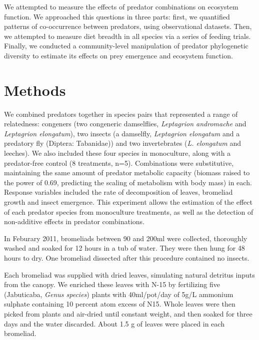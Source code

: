 \documentclass[10pt]{article}
\begin{document}
\begin{spacing}{2}
We attempted to measure the effects of predator combinations on
ecosystem function.  We approached this questions in three parts:
first, we quantified patterns of co-occurrence between predators, using
observational datasets.  Then, we attempted to measure diet breadth in
all species via a series of feeding trials.  Finally, we conducted a
community-level manipulation of predator phylogenetic diversity to
estimate its effects on prey emergence and ecosystem function.

\section{Methods}



We combined predators together in species pairs that represented a
range of relatedness: congeners (two congeneric damselflies,
\emph{Leptagrion andromache} and \emph{Leptagrion elongatum}), two
insects (a damselfly, \emph{Leptagrion elongatum} and a predatory fly
(Diptera: Tabanidae)) and two invertebrates (\emph{L. elongatum} and
leeches).  We also included these four species in monoculture, along
with a predator-free control (8 treatments, n=5).  Combinations were
substitutive, maintaining the same amount of predator metabolic
capacity (biomass raised to the power of 0.69, predicting the scaling
of metabolism with body mass) in each.  Response
variables included the rate of decomposition of leaves, bromeliad
growth and insect emergence.  This experiment allows the estimation of
the effect of each predator species from monoculture treatments, as
well as the detection of non-additive effects in predator
combinations.

In Feburary 2011, bromeliads between 90 and 200ml were collected,
thoroughly washed and soaked for 12 hours in a tub of water.  They
were then hung for 48 hours to dry.  One bromeliad dissected after
this procedure contained no insects.

Each bromeliad was supplied with dried leaves, simulating natural
detritus inputs from the canopy.  We enriched these leaves with N-15
by fertilizing five (Jabuticaba, \emph{Genus species}) plants with
40ml/pot/day of 5g/L ammonium sulphate containing 10 percent atom
excess of N15. %
Whole leaves were then picked from plants and air-dried until constant
weight, and then soaked for three days and the water discarded.  About
1.5 g of leaves were placed in each bromeliad.


\end{spacing}
\end{document}
